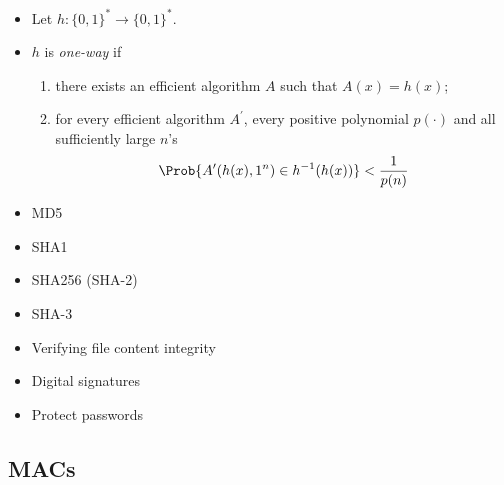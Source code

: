 \begin{frame}
  \begin{definition}
    \begin{itemize}
      \item Let \(h\colon \{0,1\}^*\to \{0,1\}^*\).
      \item \(h\) is \emph{one-way} if
        \begin{enumerate}
          \item there exists an efficient algorithm \(A\) such that \(A(x) 
              = h(x)\);
          \item for every efficient algorithm \(A^\prime\), every positive 
            polynomial \(p(\cdot)\) and all sufficiently large \(n\)'s
            \[\Prob{A^\prime(h(x), 1^n) \in h^{-1}(h(x))} < \frac{1}{p(n)}\]
        \end{enumerate}
    \end{itemize}
  \end{definition}
\end{frame}

\begin{frame}
  \begin{example}
    \begin{itemize}
      \item MD5
      \item SHA1
      \item SHA256 (SHA-2)
      \item SHA-3
    \end{itemize}
  \end{example}
  \begin{example}[Applications]
    \begin{itemize}
      \item Verifying file content integrity
      \item Digital signatures
      \item Protect passwords
    \end{itemize}
  \end{example}
\end{frame}

\subsection{\Aclp{MAC}}

